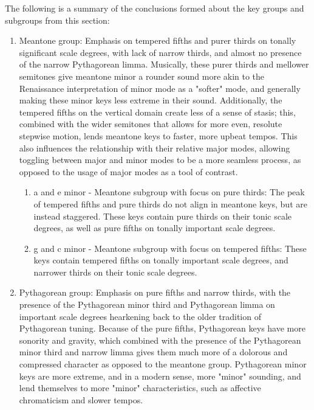The following is a summary of the conclusions formed about the key
groups and subgroups from this section:

\begin{enumerate}
\def\labelenumi{\arabic{enumi}.}
\tightlist
\item
  Meantone group: Emphasis on tempered fifths and purer thirds on
  tonally significant scale degrees, with lack of narrow thirds, and
  almost no presence of the narrow Pythagorean limma. Musically, these
  purer thirds and mellower semitones give meantone minor a rounder
  sound more akin to the Renaissance interpretation of minor mode as a
  "softer" mode, and generally making these minor keys less extreme in
  their sound. Additionally, the tempered fifths on the vertical domain
  create less of a sense of stasis; this, combined with the wider
  semitones that allows for more even, resolute stepwise motion, lends
  meantone keys to faster, more upbeat tempos. This also influences the
  relationship with their relative major modes, allowing toggling
  between major and minor modes to be a more seamless process, as
  opposed to the usage of major modes as a tool of contrast.

  \begin{enumerate}
  \def\labelenumii{\arabic{enumii}.}
  \tightlist
  \item
    a and e minor - Meantone subgroup with focus on pure thirds: The
    peak of tempered fifths and pure thirds do not align in meantone
    keys, but are instead staggered. These keys contain pure thirds on
    their tonic scale degrees, as well as pure fifths on tonally
    important scale degrees.
  \item
    g and c minor - Meantone subgroup with focus on tempered fifths:
    These keys contain tempered fifths on tonally important scale
    degrees, and narrower thirds on their tonic scale degrees.
  \end{enumerate}
\item
  Pythagorean group: Emphasis on pure fifths and narrow thirds, with the
  presence of the Pythagorean minor third and Pythagorean limma on
  important scale degrees hearkening back to the older tradition of
  Pythagorean tuning. Because of the pure fifths, Pythagorean keys have
  more sonority and gravity, which combined with the presence of the
  Pythagorean minor third and narrow limma gives them much more of a
  dolorous and compressed character as opposed to the meantone group.
  Pythagorean minor keys are more extreme, and in a modern sense, more
  "minor" sounding, and lend themselves to more "minor" characteristics,
  such as affective chromaticism and slower tempos.


\end{enumerate}
